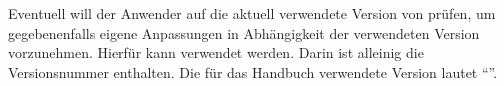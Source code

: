 \begin{Entity}{}
\begin{Declaration}
\begin{Declaration}
Eventuell will der Anwender auf die aktuell verwendete Version von \TUDScript 
prüfen, um gegebenenfalls eigene Anpassungen in Abhängigkeit der verwendeten 
Version vorzunehmen. Hierfür kann  verwendet 
werden. Darin ist alleinig die Versionsnummer enthalten. Die für das Handbuch 
verwendete Version lautet \enquote{\TUDScriptVersionNumber{}}.
\end{Declaration}
\end{Declaration}
\end{Entity}
